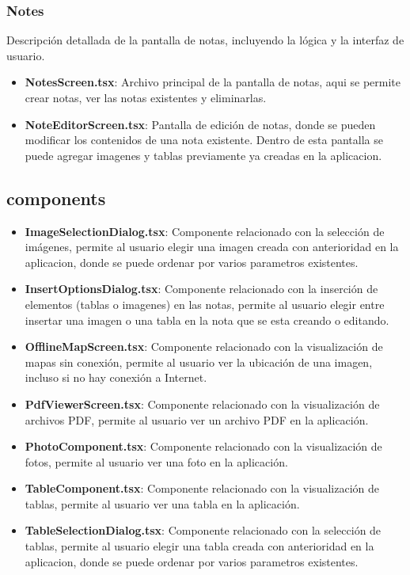 \documentclass[a4paper,12pt]{article}
\begin{document}
\subsubsection{Notes}
Descripción detallada de la pantalla de notas, incluyendo la lógica y la interfaz de usuario.
\begin{itemize}
    \item \textbf{NotesScreen.tsx}: Archivo principal de la pantalla de notas, aqui se permite crear notas, ver las notas existentes y eliminarlas. 
    \item \textbf{NoteEditorScreen.tsx}: Pantalla de edición de notas, donde se pueden modificar los contenidos de una nota existente. Dentro de esta pantalla se puede agregar imagenes y tablas previamente ya creadas en la aplicacion.
\end{itemize}

\subsection{components}

\begin{itemize}
    \item \textbf{ImageSelectionDialog.tsx}: Componente relacionado con la selección de imágenes, permite al usuario elegir una imagen creada con anterioridad en la aplicacion, donde se puede ordenar por varios parametros existentes.
    \item \textbf{InsertOptionsDialog.tsx}: Componente relacionado con la inserción de elementos (tablas o imagenes) en las notas, permite al usuario elegir entre insertar una imagen o una tabla en la nota que se esta creando o editando.
    \item \textbf{OfflineMapScreen.tsx}: Componente relacionado con la visualización de mapas sin conexión, permite al usuario ver la ubicación de una imagen, incluso si no hay conexión a Internet.
    \item \textbf{PdfViewerScreen.tsx}: Componente relacionado con la visualización de archivos PDF, permite al usuario ver un archivo PDF en la aplicación.
    \item \textbf{PhotoComponent.tsx}: Componente relacionado con la visualización de fotos, permite al usuario ver una foto en la aplicación.
    \item \textbf{TableComponent.tsx}: Componente relacionado con la visualización de tablas, permite al usuario ver una tabla en la aplicación.
    \item \textbf{TableSelectionDialog.tsx}: Componente relacionado con la selección de tablas, permite al usuario elegir una tabla creada con anterioridad en la aplicacion, donde se puede ordenar por varios parametros existentes.
\end{itemize}
\end{document}
